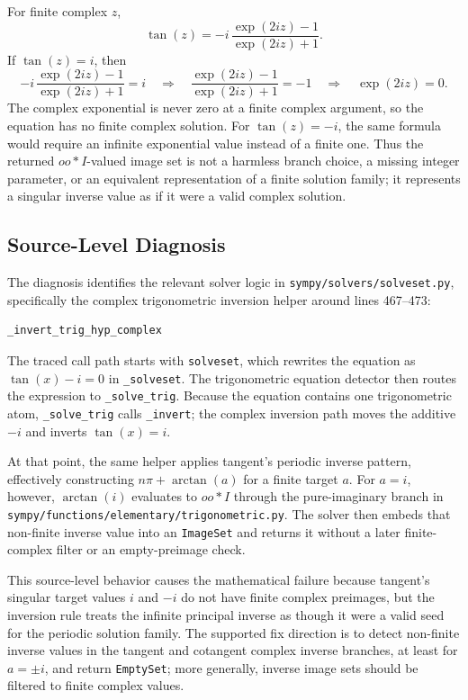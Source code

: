 \documentclass[11pt]{article}
\begin{document}
For finite complex \(z\),
\[
\tan(z) = -i\,\frac{\exp(2iz)-1}{\exp(2iz)+1}.
\]
If \(\tan(z)=i\), then
\[
-i\,\frac{\exp(2iz)-1}{\exp(2iz)+1}=i
\quad\Longrightarrow\quad
\frac{\exp(2iz)-1}{\exp(2iz)+1}=-1
\quad\Longrightarrow\quad
\exp(2iz)=0.
\]
The complex exponential is never zero at a finite complex argument, so the
equation has no finite complex solution. For \(\tan(z)=-i\), the same formula
would require an infinite exponential value instead of a finite one. Thus the
returned \(oo*I\)-valued image set is not a harmless branch choice, a missing
integer parameter, or an equivalent representation of a finite solution family;
it represents a singular inverse value as if it were a valid complex solution.

\subsection{Source-Level Diagnosis}

The diagnosis identifies the relevant solver logic in
\nolinkurl{sympy/solvers/solveset.py}, specifically the complex trigonometric
inversion helper around lines 467--473:

\begin{lstlisting}[style=bugpython]
_invert_trig_hyp_complex
\end{lstlisting}

The traced call path starts with \texttt{solveset}, which rewrites the equation
as \(\tan(x)-i=0\) in \texttt{\_solveset}. The trigonometric equation detector
then routes the expression to \texttt{\_solve\_trig}. Because the equation
contains one trigonometric atom, \texttt{\_solve\_trig} calls \texttt{\_invert};
the complex inversion path moves the additive \(-i\) and inverts
\(\tan(x)=i\).

At that point, the same helper applies tangent's periodic inverse pattern,
effectively constructing \(n\pi+\arctan(a)\) for a finite
target \(a\). For \(a=i\), however, \(\arctan(i)\) evaluates to \(oo*I\) through
the pure-imaginary branch in
\nolinkurl{sympy/functions/elementary/trigonometric.py}. The solver then embeds
that non-finite inverse value into an \texttt{ImageSet} and returns it without a
later finite-complex filter or an empty-preimage check.

This source-level behavior causes the mathematical failure because tangent's
singular target values \(i\) and \(-i\) do not have finite complex preimages,
but the inversion rule treats the infinite principal inverse as though it were a
valid seed for the periodic solution family. The supported fix direction is to
detect non-finite inverse values in the tangent and cotangent complex inverse
branches, at least for \(a=\pm i\), and return \texttt{EmptySet}; more generally,
inverse image sets should be filtered to finite complex values.
\end{document}

